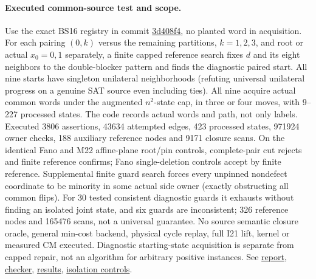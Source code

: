 \documentclass[11pt]{article}
\begin{document}
\paragraph{Executed common-source test and scope.}
Use the exact BS16 registry in commit \href{https://github.com/j15marti/pnp/commit/3d408f496ef04f94fe38b4a248d2c77b27c8dcc1}{3d408f4}, no planted word in acquisition. For each pairing $(0,k)$ versus the remaining partitions, $k=1,2,3$, and root or actual $x_0=0,1$ separately, a finite capped reference search fixes $d$ and its eight neighbors to the double-blocker pattern and finds the diagnostic paired start. All nine starts have singleton unilateral neighborhoods (refuting universal unilateral progress on a genuine SAT source even including ties). All nine acquire actual common words under the augmented $n^2$-state cap, in three or four moves, with 9--227 processed states. The code records actual words and path, not only labels. Executed 3806 assertions, 43634 attempted edges, 423 processed states, 971924 owner checks, 188 auxiliary reference nodes and 9171 closure scans. On the identical Fano and M22 affine-plane root/pin controls, complete-pair cut rejects and finite reference confirms; Fano single-deletion controls accept by finite reference. Supplemental finite guard search forces every unpinned nondefect coordinate to be minority in some actual side owner (exactly obstructing all common flips). For 30 tested consistent diagnostic guards it exhausts without finding an isolated joint state, and six guards are inconsistent; 326 reference nodes and 165476 scans, not a universal guarantee. No source semantic closure oracle, general min-cost backend, physical cycle replay, full I21 lift, kernel or measured CM executed. Diagnostic starting-state acquisition is separate from capped repair, not an algorithm for arbitrary positive instances. See \href{https://github.com/j15marti/pnp/commit/ae10b6bf2f7fc7f1033308d43b8e92dafd81286d}{report}, \href{https://github.com/j15marti/pnp/commit/47733b061b0bec2d7d5fff8d94572ae71fbee745}{checker}, \href{https://github.com/j15marti/pnp/commit/a412bf23a0b63f03c886b7bf5bd50217b5502db2}{results}, \href{https://github.com/j15marti/pnp/commit/1a36d8be4d22c332cf59d69ba8cebe7a230be837}{isolation controls}.
\end{document}
